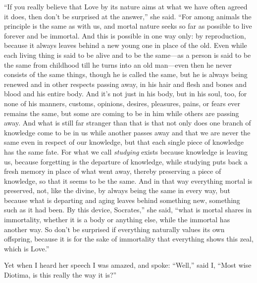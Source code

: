 “If you really believe that Love by its nature aims at what we have
often  agreed it does, then don't be surprised at the answer,”
she said. “For among animals the principle is the same as with us, and
mortal nature seeks so far as possible to live forever and be immortal.
And this is possible in one way only: by reproduction, because it always
leaves behind a new young one in place of the old. Even while each
living thing is said to be alive and to be the same---as a person is
said to be the same from childhood till he turns into an old man---even
then he never consists of the same things, though he is called the same,
but he is always being renewed and  in other respects passing
away, in his hair and flesh and bones and blood and his entire body. And
it's not just in his body, but in his soul, too, for none of his
manners, customs, opinions, desires, pleasures, pains, or fears ever
remains the same, but some are coming to be in him while others are
passing away. And what is still far stranger than that is that not only
 does one branch of knowledge come to be in us while
another passes away and that we are never the same even in respect of
our knowledge, but that each single piece of knowledge has the same
fate. For what we call {\em studying} exists because knowledge is
leaving us, because forgetting is the departure of knowledge, while
studying puts back a fresh memory in place of what went away, thereby
preserving a piece of knowledge, so that it seems to be the same. And in
that way everything mortal is preserved, not, like the divine, by always
being the same in every way, but because  what is departing and
aging leaves behind something new, something such as it had been. By
this device, Socrates,” she said, “what is mortal shares in immortality,
whether it is a body or anything else, while the immortal has another
way. So don't be surprised if everything naturally values its own
offspring, because it is for the sake of immortality that everything
shows this zeal, which is Love.”

Yet when I heard her speech I was amazed, and spoke: “Well,” said I,
 “Most wise Diotima, is this really the way it is?”


